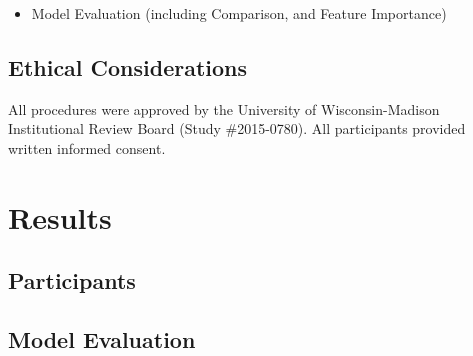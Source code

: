 \documentclass[
  letterpaper,
  DIV=11,
  numbers=noendperiod]{scrartcl}
\providecommand{\tightlist}{%
  \setlength{\itemsep}{0pt}\setlength{\parskip}{0pt}}\usepackage{longtable,booktabs,array}
\begin{document}
\begin{itemize}
\tightlist
\item
  Model Evaluation (including Comparison, and Feature Importance)
\end{itemize}

\subsection{Ethical Considerations}\label{ethical-considerations}

All procedures were approved by the University of Wisconsin-Madison
Institutional Review Board (Study \#2015-0780). All participants
provided written informed consent.

\section{Results}\label{results}

\subsection{Participants}\label{participants}

\subsection{Model Evaluation}\label{model-evaluation}
\end{document}
